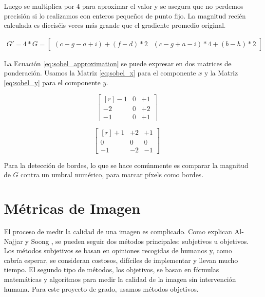 \documentclass[pregrado]{tesis-usb} %
\begin{document}
Luego se multiplica por $4$ para aproximar el valor y se asegura que no perdemos precisión si lo realizamos con enteros pequeños de punto fijo. La magnitud recién calculada es dieciséis veces más grande que el gradiente promedio original.

\begin{equation}\label{eq:sobel_approximation}
\begin{split}
G' = 4 * G =\begin{bmatrix*}(c-g-a+i)+(f-d)*2 & (c-g+a-i)*4+(b-h)*2\end{bmatrix*}
\end{split}
\end{equation}

La Ecuación \ref{eq:sobel_approximation} se puede expresar en dos matrices de ponderación. Usamos la Matriz \ref{eq:sobel_x} para el componente $x$ y la Matriz \ref{eq:sobel_y} para el componente $y$.

\begin{equation}
\begin{bmatrix*}[r]\label{eq:sobel_x}
-1 &  0 & +1 \\
-2 &  0 & +2 \\
-1 &  0 & +1
\end{bmatrix*}
\end{equation}

\begin{equation}
\begin{bmatrix*}[r]\label{eq:sobel_y}
+1 & +2 & +1 \\
 0 &  0 &  0 \\
-1 & -2 & -1
\end{bmatrix*}
\end{equation}

Para la detección de bordes, lo que se hace comúnmente es comparar la magnitud de $G$ contra un umbral numérico, para marcar píxels como bordes.

\section{Métricas de Imagen}
El proceso de medir la calidad de una imagen es complicado. Como explican Al-Najjar y Soong \cite{Yusra2012}, se pueden seguir dos métodos principales: subjetivos u objetivos. Los métodos subjetivos se basan en opiniones recogidas de humanos y, como cabría esperar, se consideran costosos, difíciles de implementar y llevan mucho tiempo. El segundo tipo de métodos, los objetivos, se basan en fórmulas matemáticas y algoritmos para medir la calidad de la imagen sin intervención humana. Para este proyecto de grado, usamos métodos objetivos.
\end{document}
